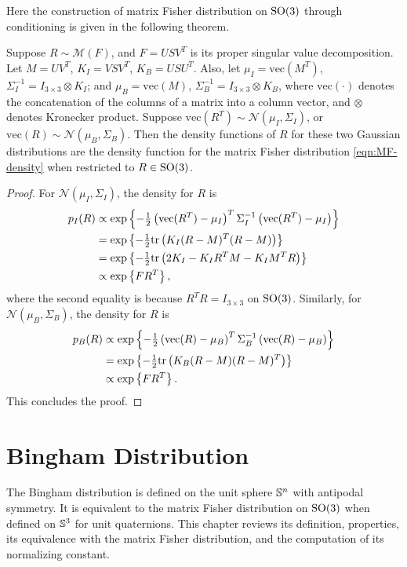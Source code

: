Here the construction of matrix Fisher distribution on $\mathrm{SO}(3)$ through conditioning is given in the following theorem.
\begin{theorem} \label{thm:MF-construction}
	Suppose $R\sim\mathcal{M}(F)$, and $F=USV^T$ is its proper singular value decomposition.
	Let $M = UV^T$, $K_I = VSV^T$, $K_B = USU^T$.
	Also, let $\mu_I = \mathrm{vec}(M^T)$, $\Sigma_I^{-1} = I_{3\times 3}\otimes K_I$; and $\mu_B = \mathrm{vec}(M)$, $\Sigma_B^{-1} = I_{3\times 3}\otimes K_B$, where $\mathrm{vec}(\cdot)$ denotes the concatenation of the columns of a matrix into a column vector, and $\otimes$ denotes Kronecker product.
	Suppose $\mathrm{vec}(R^T) \sim \mathcal{N}(\mu_I,\Sigma_I)$, or $\mathrm{vec}(R) \sim \mathcal{N}(\mu_B,\Sigma_B)$.
	Then the density functions of $R$ for these two Gaussian distributions are the density function for the matrix Fisher distribution \eqref{eqn:MF-density} when restricted to $R\in\mathrm{SO}(3)$.
\end{theorem}
\begin{proof}
	For $\mathcal{N}(\mu_I,\Sigma_I)$, the density for $R$ is
	\begin{align*}
		p_I(R) &\propto \exp\left\{ -\tfrac{1}{2} \left( \mathrm{vec}(R^T)-\mu_I \right)^T \Sigma_I^{-1} \left( \mathrm{vec}(R^T)-\mu_I \right) \right\} \\
		&= \exp\left\{ -\tfrac{1}{2} \mathrm{tr}\left( K_I(R-M)^T(R-M) \right) \right\} \\
		&= \exp\left\{ -\tfrac{1}{2} \mathrm{tr}\left( 2K_I - K_IR^TM - K_IM^TR \right) \right\} \\
		&\propto \exp\left\{ FR^T \right\},
	\end{align*}
	where the second equality is because $R^TR = I_{3\times 3}$ on $\mathrm{SO}(3)$.
	Similarly, for $\mathcal{N}(\mu_B,\Sigma_B)$, the density for $R$ is
	\begin{align*}
		p_B(R) &\propto \exp\left\{ -\tfrac{1}{2} \left( \mathrm{vec}(R)-\mu_B \right)^T \Sigma_B^{-1} \left( \mathrm{vec}(R)-\mu_B \right) \right\} \\
		&= \exp\left\{ -\tfrac{1}{2} \mathrm{tr}\left( K_B(R-M)(R-M)^T \right) \right\} \\
		&\propto \exp\left\{ FR^T \right\}.
	\end{align*}
	This concludes the proof.
\end{proof}

\section{Bingham Distribution} \label{section:MF-Bingham}

The Bingham distribution is defined on the unit sphere $\mathbb{S}^n$ with antipodal symmetry.
It is equivalent to the matrix Fisher distribution on $\mathrm{SO}(3)$ when defined on $\mathbb{S}^3$ for unit quaternions.
This chapter reviews its definition, properties, its equivalence with the matrix Fisher distribution, and the computation of its normalizing constant.

